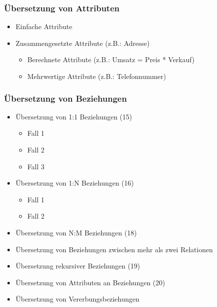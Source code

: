 \subsubsection{Übersetzung von Attributen}
\begin{itemize}
	\item Einfache Attribute
	\item Zusammengesetzte Attribute (z.B.: Adresse)
	\begin{itemize}
		\item Berechnete Attribute (z.B.: Umsatz = Preis * Verkauf)
		\item Mehrwertige Attribute (z.B.: Telefonnummer)
	\end{itemize}
\end{itemize}
\subsubsection{Übersetzung von Beziehungen}
\begin{itemize}
	\item Übersetzung von 1:1 Beziehungen (15)
	\begin{itemize}
		\item Fall 1
		\item Fall 2
		\item Fall 3
	\end{itemize}
	\item Übersetzung von 1:N Beziehungen (16)
	\begin{itemize}
		\item Fall 1
		\item Fall 2
	\end{itemize}
	\item Übersetzung von N:M Beziehungen (18)
	\item Übersetzung von Beziehungen zwischen mehr als zwei Relationen
	\item Übersetzung rekursiver Beziehungen (19)
	\item Übersetzung von Attributen an Beziehungen (20)
	\item Übersetzung von Vererbungsbeziehungen
\end{itemize}


